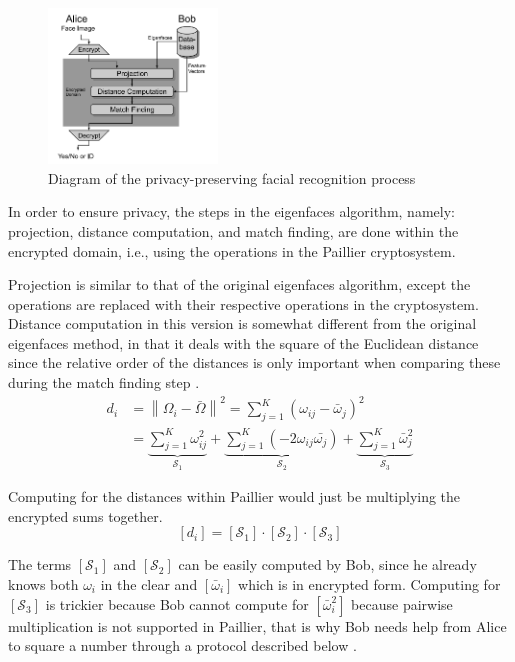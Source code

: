 \begin{figure}[h]
    \centering
    \includegraphics[width=0.4\textwidth]{figures/secure_eigenfaces.png}
    \caption{Diagram of the privacy-preserving facial recognition process \cite{hutchison_privacy-preserving_2009}}
\end{figure}

In order to ensure privacy, the steps in the eigenfaces algorithm, namely: projection, distance computation, and match finding, are done within the encrypted domain, i.e., using the operations in the Paillier cryptosystem.

Projection is similar to that of the original eigenfaces algorithm, except the operations are replaced with their respective operations in the cryptosystem. Distance computation in this version is somewhat different from the original eigenfaces method, in that it deals with the square of the Euclidean distance since the relative order of the distances is only important when comparing these during the match finding step \cite{hutchison_privacy-preserving_2009}.
\begin{align}
    d_i &= \left\lVert \Omega_i - \bar{\Omega} \right\rVert ^2 = \sum_{j=1}^{K} \left(\omega_{ij} - \bar{\omega}_j\right)^2 \\
        &= \underbrace{\sum_{j=1}^{K} \omega_{ij}^2}_{\mathcal{S}_1} + \underbrace{\sum_{j=1}^{K} \left(-2 \omega_{ij} \bar{\omega_j}\right)}_{\mathcal{S}_2} + \underbrace{\sum_{j=1}^{K} \bar{\omega}_{j}^2}_{\mathcal{S}_3}
\end{align}

Computing for the distances within Paillier would just be multiplying the encrypted sums together.
\begin{equation}
	\left[d_i\right] = \left[\mathcal{S}_1\right] \cdot \left[\mathcal{S}_2\right] \cdot \left[\mathcal{S}_3\right]
\end{equation}

The terms $\left[\mathcal{S}_1\right]$ and $\left[\mathcal{S}_2\right]$ can be easily computed by Bob, since he already knows both $\omega_i$ in the clear and $\left[\bar{\omega}_i\right]$ which is in encrypted form. Computing for $\left[\mathcal{S}_3\right]$ is trickier because Bob cannot compute for $\left[\bar{\omega}_i^2\right]$ because pairwise multiplication is not supported in Paillier, that is why Bob needs help from Alice to square a number through a protocol described below \cite{hutchison_privacy-preserving_2009}.

